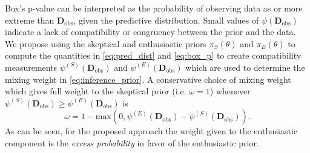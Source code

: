 \documentclass[useAMS,usenatbib,referee]{biom}
\begin{document}
Box's p-value can be interpreted as the probability of observing data as or more extreme than $\mathbf{D}_{\text{obs}}$, given the predictive distribution. 
%
Small values of $\psi({\mathbf{D}_{\text{obs}}})$ indicate a lack of compatibility or congruency between the prior and the data. 
%
We propose using the skeptical and enthusiastic priors $\pi_S(\theta)$ and $\pi_E(\theta)$ to compute the quantities in \eqref{eq:pred_dist} and \eqref{eq:box_p} to create compatibility measurements $\psi^{(S)}(\mathbf{D}_{\text{obs}})$ and $\psi^{(E)}(\mathbf{D}_{\text{obs}})$ which are used to determine the mixing weight in \eqref{eq:inference_prior}. 
%
A conservative choice of mixing weight which gives full weight to the skeptical prior (i.e. $\omega=1$) whenever $\psi^{(S)}(\mathbf{D}_{\text{obs}})\geq \psi^{(E)}(\mathbf{D}_{\text{obs}})$ is
\begin{equation}\label{eq:adaptive_prior}
\omega = 1 - \text{max}\left(0, \psi^{(E)}(\mathbf{D}_{\text{obs}})-\psi^{(S)}(\mathbf{D}_{\text{obs}})\right).
\end{equation}
%
As can be seen, for the proposed approach the weight given to the enthusiastic component is the \textit{excess probability} in favor of the enthusiastic prior.
%




%

%


\end{document}
